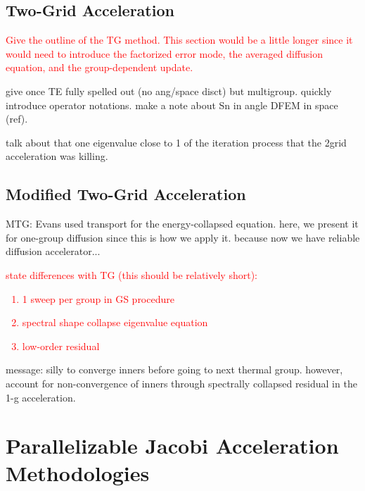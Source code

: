 \documentclass[preprint,10pt]{elsarticle}
\newcommand{\tcr}[1]{\textcolor{red}{#1}}
\begin{document}
\subsection{Two-Grid Acceleration}

\tcr{Give the outline of the TG method. This section would be a little longer since it would need to introduce the factorized error mode, the averaged diffusion equation, and the group-dependent update.}

give once TE fully spelled out (no ang/space disct) but multigroup. quickly introduce operator notations. make a note about Sn in angle DFEM in space (ref).

talk about that one eigenvalue close to 1 of the iteration process that the 2grid acceleration was killing.

\subsection{Modified Two-Grid Acceleration}
MTG: Evans used transport for the energy-collapsed equation. here, we present it for one-group diffusion since this is how we apply it. because now we have reliable diffusion accelerator...
\tcr
{
state differences with TG (this should be relatively short):
\begin{enumerate}
\item 1 sweep per group in GS procedure
\item spectral shape collapse eigenvalue equation
\item low-order residual
\end{enumerate}
}
message: silly to converge inners before going to next thermal group. however, account for non-convergence of inners through spectrally collapsed residual in the 1-g acceleration.

\section{Parallelizable Jacobi Acceleration Methodologies} \label{sec::Jac}
\end{document}
